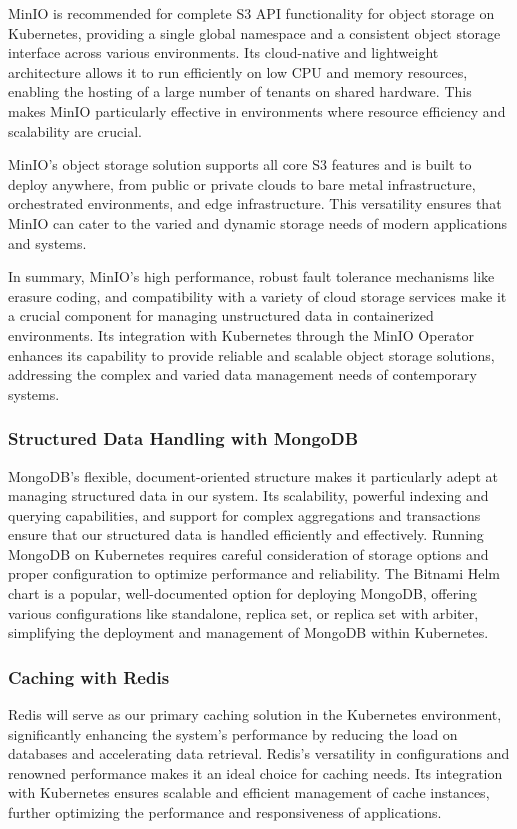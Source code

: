 \documentclass{article}
\begin{document}
    MinIO is recommended for complete S3 API functionality for object storage on Kubernetes, providing a single global namespace and a consistent object storage interface across various environments. Its cloud-native and lightweight architecture allows it to run efficiently on low CPU and memory resources, enabling the hosting of a large number of tenants on shared hardware. This makes MinIO particularly effective in environments where resource efficiency and scalability are crucial.

    MinIO's object storage solution supports all core S3 features and is built to deploy anywhere, from public or private clouds to bare metal infrastructure, orchestrated environments, and edge infrastructure. This versatility ensures that MinIO can cater to the varied and dynamic storage needs of modern applications and systems.

    In summary, MinIO's high performance, robust fault tolerance mechanisms like erasure coding, and compatibility with a variety of cloud storage services make it a crucial component for managing unstructured data in containerized environments. Its integration with Kubernetes through the MinIO Operator enhances its capability to provide reliable and scalable object storage solutions, addressing the complex and varied data management needs of contemporary systems.

    \subsubsection{Structured Data Handling with MongoDB}
    MongoDB's flexible, document-oriented structure makes it particularly adept at managing structured data in our system. Its scalability, powerful indexing and querying capabilities, and support for complex aggregations and transactions ensure that our structured data is handled efficiently and effectively. Running MongoDB on Kubernetes requires careful consideration of storage options and proper configuration to optimize performance and reliability. The Bitnami Helm chart is a popular, well-documented option for deploying MongoDB, offering various configurations like standalone, replica set, or replica set with arbiter, simplifying the deployment and management of MongoDB within Kubernetes.

    \subsubsection{Caching with Redis}
    Redis will serve as our primary caching solution in the Kubernetes environment, significantly enhancing the system's performance by reducing the load on databases and accelerating data retrieval. Redis's versatility in configurations and renowned performance makes it an ideal choice for caching needs. Its integration with Kubernetes ensures scalable and efficient management of cache instances, further optimizing the performance and responsiveness of applications.
\end{document}
